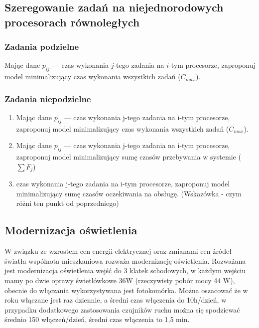 \documentclass[
    12pt, %
]{../fphw}
\begin{document}
\subsection{Szeregowanie zadań na niejednorodowych procesorach równoległych}
\subsubsection{Zadania podzielne}
Mając dane \(p_{ij}\) — czas wykonania \(j\)-tego zadania na \(i\)-tym procesorze,
zaproponuj model minimalizujący czas wykonania wszystkich zadań (\(C_{max}\)).
\subsubsection{Zadania niepodzielne}
\begin{enumerate}[label=(\alph*)]
    \item \label{22a} Mając dane \(p_{ij}\) — czas wykonania j-tego zadania na i-tym procesorze,
          zaproponuj model minimalizujący czas wykonania wszystkich
          zadań (\(C_{max}\)).
    \item \label{22b} Mając dane \(p_{ij}\) — czas wykonania j-tego zadania na i-tym procesorze,
          zaproponuj model minimalizujący sumę czasów przebywania w
          systemie (\(\sum F_j\))
    \item \label{22c} czas wykonania j-tego zadania na i-tym procesorze,
          zaproponuj model minimalizujący sumę czasów oczekiwania na obsługę.
          (Wskazówka - czym różni ten punkt od poprzedniego)
\end{enumerate}

\subsection{Modernizacja oświetlenia}
W związku ze wzrostem cen energii elektrycznej oraz zmianami cen źródeł światła wspólnota mieszkaniowa rozważa modernizację oświetlenia.
Rozważana jest modernizacja oświetlenia wejść do 3 klatek schodowych, w każdym wejściu
mamy po dwie oprawy świetlówkowe 36W (rzeczywisty pobór mocy 44 W),
obecnie do włączania wykorzystywana jest fotokomórka. Można oszacować
że w roku włączane jest raz dziennie, a średni czas włączenia do 10h/dzień, w
przypadku dodatkowego zastosowania czujników ruchu można się spodziewać
średnio 150 włączeń/dzień, średni czas włączenia to 1,5 min.
\end{document}
